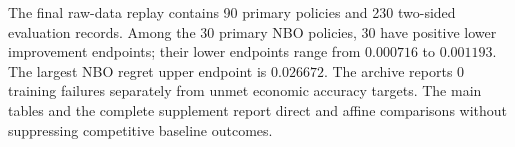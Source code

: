 The final raw-data replay contains 90 primary policies and 230 two-sided evaluation records. Among the 30 primary NBO policies, 30 have positive lower improvement endpoints; their lower endpoints range from $0.000716$ to $0.001193$. The largest NBO regret upper endpoint is $0.026672$. The archive reports 0 training failures separately from unmet economic accuracy targets. The main tables and the complete supplement report direct and affine comparisons without suppressing competitive baseline outcomes.

